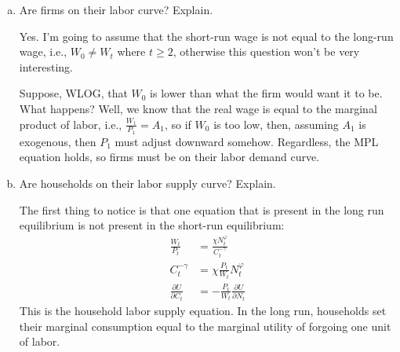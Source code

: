 \documentclass[answers]{exam}
\newcommand{\1}{\mathbf{1}}
\begin{document}
\begin{enumerate}[(a)]
	\item Are firms on their labor curve? Explain.
	\begin{solution}
        Yes. I'm going to assume that the short-run wage is not equal to the long-run wage, i.e., $W_0 \neq W_t$ where $t \geq 2$, otherwise this question won't be very interesting.

        Suppose, WLOG, that $W_0$ is lower than what the firm would want it to be. What happens? Well, we know that the real wage is equal to the marginal product of labor, i.e., $\frac{W_1}{P_1}=A_1$, so if $W_0$ is too low, then, assuming $A_1$ is exogenous, then $P_1$ must adjust downward somehow. Regardless, the MPL equation holds, so firms must be on their labor demand curve.
    \end{solution}
	\item Are households on their labor supply curve? Explain.
	\begin{solution}
        The first thing to notice is that one equation that is present in the long run equilibrium is not present in the short-run equilibrium:
        \begin{align*}
            \frac{W_t}{P_t}& =\frac{\chi N_t^\varphi}{C_t^{-\gamma}} \\
            C_t^{-\gamma} & =\chi \frac{P_t}{W_t} N_t^\varphi \\
             \frac{\partial U}{\partial C_t} & = - \frac{P_t}{W_t} \frac{\partial U}{\partial N_t}
        \end{align*}
        This is the household labor supply equation. In the long run, households set their marginal consumption equal to the marginal utility of forgoing one unit of labor.


\end{solution}
\end{enumerate}
\end{document}
